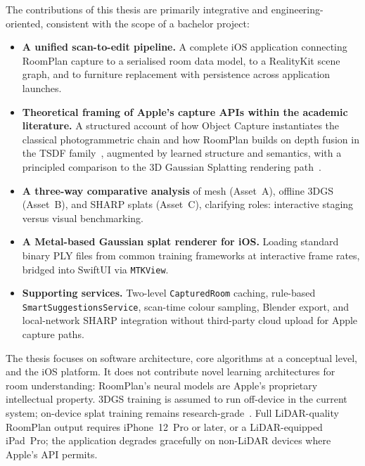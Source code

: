 The contributions of this thesis are primarily integrative and
engineering-oriented, consistent with the scope of a bachelor project:

\begin{itemize}
  \item \textbf{A unified scan-to-edit pipeline.}
    A complete iOS application connecting RoomPlan capture to a serialised
    room data model, to a RealityKit scene graph, and to furniture replacement
    with persistence across application launches.

  \item \textbf{Theoretical framing of Apple's capture APIs within the
    academic literature.}
    A structured account of how Object Capture instantiates the classical
    photogrammetric chain and how RoomPlan builds on depth fusion in the TSDF
    family~\cite{newcombe2011kinectfusion}, augmented by learned structure and
    semantics, with a principled comparison to the 3D Gaussian Splatting
    rendering path~\cite{kerbl20233dgs}.

  \item \textbf{A three-way comparative analysis} of mesh (Asset~A),
    offline 3DGS (Asset~B), and SHARP splats (Asset~C), clarifying roles:
    interactive staging versus visual benchmarking.

  \item \textbf{A Metal-based Gaussian splat renderer for iOS.}
    Loading standard binary PLY files from common training frameworks at
    interactive frame rates, bridged into SwiftUI via \texttt{MTKView}.

  \item \textbf{Supporting services.}
    Two-level \texttt{CapturedRoom} caching, rule-based
    \texttt{SmartSuggestionsService}, scan-time colour sampling, Blender export,
    and local-network SHARP integration without third-party cloud upload for
    Apple capture paths.
\end{itemize}

The thesis focuses on software architecture, core algorithms at a conceptual
level, and the iOS platform. It does not contribute novel learning
architectures for room understanding: RoomPlan's neural models are Apple's
proprietary intellectual property. 3DGS training is assumed to run off-device
in the current system; on-device splat training remains
research-grade~\cite{Guo26}. Full LiDAR-quality RoomPlan output requires
iPhone~12~Pro or later, or a LiDAR-equipped iPad~Pro; the application
degrades gracefully on non-LiDAR devices where Apple's API permits.


